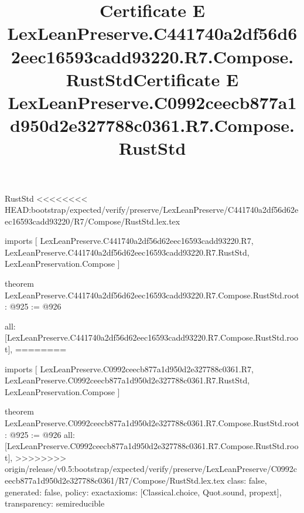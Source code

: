 \begin{lexlean}{RustStd}
<<<<<<<< HEAD:bootstrap/expected/verify/preserve/LexLeanPreserve/C441740a2df56d62eec16593cadd93220/R7/Compose/RustStd.lex.tex
\title{Certificate E LexLeanPreserve.C441740a2df56d62eec16593cadd93220.R7.Compose.RustStd}
\begin{coremodule}
imports [
  LexLeanPreserve.C441740a2df56d62eec16593cadd93220.R7,
  LexLeanPreserve.C441740a2df56d62eec16593cadd93220.R7.RustStd,
  LexLeanPreservation.Compose
]

theorem LexLeanPreserve.C441740a2df56d62eec16593cadd93220.R7.Compose.RustStd.root : @925 := @926 {
  all: [LexLeanPreserve.C441740a2df56d62eec16593cadd93220.R7.Compose.RustStd.root],
========
\title{Certificate E LexLeanPreserve.C0992ceecb877a1d950d2e327788c0361.R7.Compose.RustStd}
\begin{coremodule}
imports [
  LexLeanPreserve.C0992ceecb877a1d950d2e327788c0361.R7,
  LexLeanPreserve.C0992ceecb877a1d950d2e327788c0361.R7.RustStd,
  LexLeanPreservation.Compose
]

theorem LexLeanPreserve.C0992ceecb877a1d950d2e327788c0361.R7.Compose.RustStd.root : @925 := @926 {
  all: [LexLeanPreserve.C0992ceecb877a1d950d2e327788c0361.R7.Compose.RustStd.root],
>>>>>>>> origin/release/v0.5:bootstrap/expected/verify/preserve/LexLeanPreserve/C0992ceecb877a1d950d2e327788c0361/R7/Compose/RustStd.lex.tex
  class: false,
  generated: false,
  policy: exact{axioms: [Classical.choice, Quot.sound, propext]},
  transparency: semireducible
}


\end{coremodule}}
\end{coremodule}
\end{lexlean}
